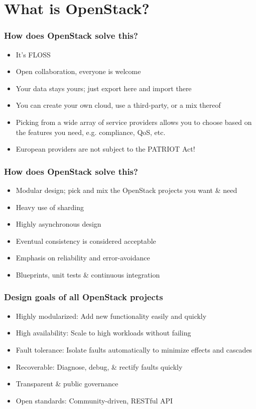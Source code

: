 \documentclass[t]{beamer}
\begin{document}
\section{What is OpenStack?}

\begin{frame}
	\frametitle{How does OpenStack solve this?}
	\begin{itemize}
		\item It's FLOSS
		\item Open collaboration, everyone is welcome
		\item Your data stays yours; just export here and import there
		\item You can create your own cloud, use a third-party, or a mix thereof
		\item Picking from a wide array of service providers allows you to choose based on the features you need, e.g. compliance, QoS, etc.
		\item European providers are not subject to the PATRIOT Act!
	\end{itemize}
\end{frame}

\begin{frame}
	\frametitle{How does OpenStack solve this?}
	\begin{itemize}
		\item Modular design; pick and mix the OpenStack projects you want \& need
		\item Heavy use of sharding
		\item Highly asynchronous design
		\item Eventual consistency is considered acceptable
		\item Emphasis on reliability and error-avoidance
		\item Blueprints, unit tests \& continuous integration
	\end{itemize}
\end{frame}

\begin{frame}
	\frametitle{Design goals of all OpenStack projects}
	\begin{itemize}
		\item Highly modularized: Add new functionality easily and quickly
		\item High availability: Scale to high workloads without failing
		\item Fault tolerance: Isolate faults automatically to minimize effects and cascades
		\item Recoverable: Diagnose, debug, \& rectify faults quickly
		\item Transparent \& public governance
		\item Open standards: Community-driven, RESTful API
	\end{itemize}
\end{frame}
\end{document}
